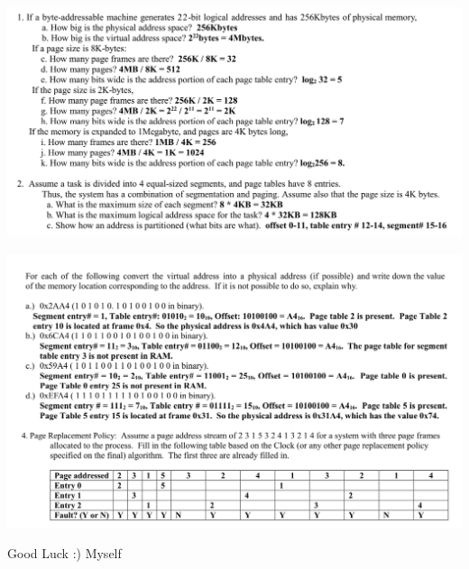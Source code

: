 \documentclass[10pt]{article}
\begin{document}
\bigbreak
\includegraphics[scale = 0.7]{segment1.png}
\bigbreak

\bigbreak
\includegraphics[scale = 0.7]{segment2.png}
\bigbreak

\newpage
\begin{center}
	Good Luck :) Myself
\end{center}
\end{document}
